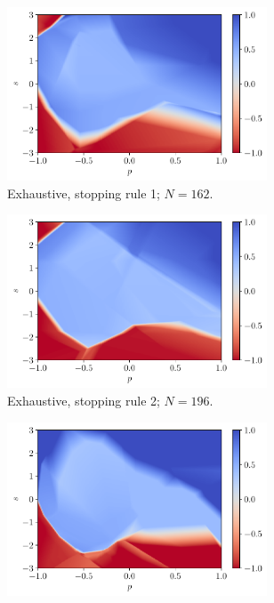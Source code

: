 \documentclass[a4paper, 12pt]{article}
\begin{document}
	\begin{figure}[H]
	    \centering
        \begin{subfigure}{0.49\textwidth}
            \centering
            \includegraphics[width=0.85\textwidth]{resources/pdf/4_exhaustive_1_MLP_q_-4.pdf}
            \caption{Exhaustive, stopping rule 1; $N = 162$.}
            \vspace{0.5em}
        \end{subfigure}
        \hfill
        \begin{subfigure}{0.49\textwidth}
            \centering
            \includegraphics[width=0.85\textwidth]{resources/pdf/4_exhaustive_2_MLP_q_-4.pdf}
            \caption{Exhaustive, stopping rule 2; $N = 196$.}
            \vspace{0.5em}
        \end{subfigure}
        \begin{subfigure}{0.49\textwidth}
            \centering
            \includegraphics[width=0.85\textwidth]{resources/pdf/4_montecarlo_1_MLP_q_-4.pdf}

\end{subfigure}
\end{figure}
\end{document}
